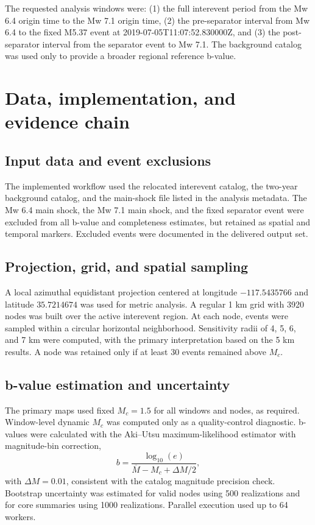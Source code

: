\documentclass[11pt]{article}
\begin{document}
The requested analysis windows were: (1) the full interevent period from the Mw 6.4 origin time to the Mw 7.1 origin time, (2) the pre-separator interval from Mw 6.4 to the fixed M5.37 event at 2019-07-05T11:07:52.830000Z, and (3) the post-separator interval from the separator event to Mw 7.1. The background catalog was used only to provide a broader regional reference b-value.

\section{Data, implementation, and evidence chain}
\subsection{Input data and event exclusions}
The implemented workflow used the relocated interevent catalog, the two-year background catalog, and the main-shock file listed in the analysis metadata. The Mw 6.4 main shock, the Mw 7.1 main shock, and the fixed separator event were excluded from all b-value and completeness estimates, but retained as spatial and temporal markers. Excluded events were documented in the delivered output set.

\subsection{Projection, grid, and spatial sampling}
A local azimuthal equidistant projection centered at longitude $-117.5435766$ and latitude $35.7214674$ was used for metric analysis. A regular 1 km grid with 3920 nodes was built over the active interevent region. At each node, events were sampled within a circular horizontal neighborhood. Sensitivity radii of 4, 5, 6, and 7 km were computed, with the primary interpretation based on the 5 km results. A node was retained only if at least 30 events remained above $M_c$.

\subsection{b-value estimation and uncertainty}
The primary maps used fixed $M_c=1.5$ for all windows and nodes, as required. Window-level dynamic $M_c$ was computed only as a quality-control diagnostic. b-values were calculated with the Aki--Utsu maximum-likelihood estimator with magnitude-bin correction,
\[
 b = \frac{\log_{10}(e)}{\overline{M} - M_c + \Delta M/2},
\]
with $\Delta M=0.01$, consistent with the catalog magnitude precision check. Bootstrap uncertainty was estimated for valid nodes using 500 realizations and for core summaries using 1000 realizations. Parallel execution used up to 64 workers.
\end{document}
